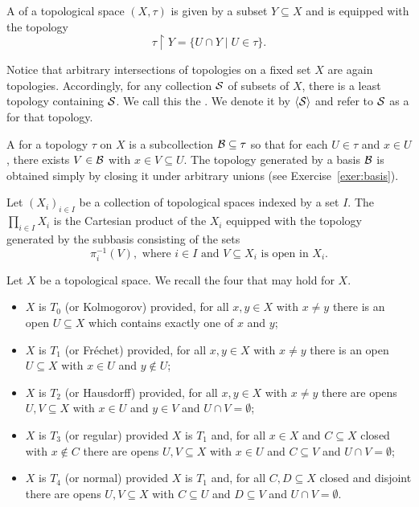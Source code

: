 A  of a topological space $(X,\tau)$ is given by a subset $Y\subseteq X$ and is equipped with the topology
\[
\tau\upharpoonright Y=\{U\cap Y\mid U\in\tau\}.
\]

Notice that arbitrary intersections of topologies on a fixed set $X$ are again topologies. Accordingly, for any collection $\mathcal{S}$ of subsets of $X$, there is a least topology containing $\mathcal{S}$. We call this the . We denote it by ${\langle}\mathcal{S}{\rangle}$ and refer to $\mathcal{S}$ as a  for that topology.

A   for a topology $\tau$ on $X$ is a subcollection $\mathcal{B}\subseteq\tau$ so that for each $U\in\tau$ and $x \in U$, there exists $V\in\mathcal{B}$ with $x\in V\subseteq U$. The topology generated by a basis $\mathcal{B}$ is obtained simply by closing it under arbitrary unions (see Exercise~\ref{exer:basis}).

Let $(X_i)_{i \in I}$ be a collection of topological spaces indexed by a set $I$. The  $\prod_{i\in I} X_i$ is the Cartesian product of the $X_i$ equipped with the topology generated by the subbasis consisting of the sets
\[
\pi_i^{-1}(V), \text{ where }i\in I \text{ and } V\subseteq X_i \text{ is open in  }X_i.
\]

Let $X$ be a topological space. We recall the four  that may hold for $X$.
\begin{itemize}
\item $X$ is $T_0$ (or Kolmogorov) provided, for all $x,y\in X$ with $x\neq y$ there is an open $U\subseteq X$ which contains exactly one of $x$ and $y$;
\item $X$ is $T_1$ (or Fr\'echet) provided, for all $x,y\in X$ with $x\neq y$ there is an open $U\subseteq X$ with
$x\in U$ and $y\not\in U$;
\item $X$ is $T_2$ (or Hausdorff) provided, for all $x,y\in X$ with $x\neq y$ there are opens $U,V\subseteq X$ with
$x\in U$ and $y\in V$ and $U\cap V=\emptyset$;
\item $X$ is $T_3$ (or regular) provided $X$ is $T_1$ and, for all $x\in X$ and $C\subseteq X$ closed with $x\not\in C$ there are opens $U,V\subseteq X$ with $x\in U$ and $C\subseteq V$ and $U\cap V=\emptyset$;
\item $X$ is $T_4$ (or normal) provided $X$ is $T_1$ and, for all $C,D\subseteq X$ closed and disjoint there are opens $U,V\subseteq X$ with $C\subseteq U$ and $D\subseteq V$ and $U\cap V=\emptyset$.
\end{itemize}

